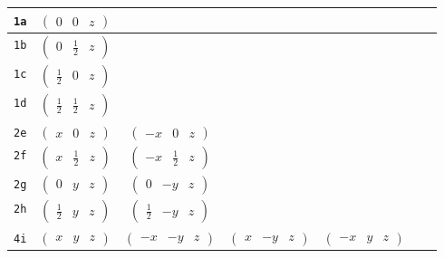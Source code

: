 \documentclass[fleqn,9pt,landscape]{jsarticle}
\begin{document}
\begin{center}
\begin{longtable}{ccccccc}
{\tt 1a} & $ \begin{pmatrix} 0 & 0 & z \end{pmatrix} $ & $  $ & $  $ & $  $ \\ \hline
{\tt 1b} & $ \begin{pmatrix} 0 & \frac{1}{2} & z \end{pmatrix} $ & $  $ & $  $ & $  $ \\ \hline
{\tt 1c} & $ \begin{pmatrix} \frac{1}{2} & 0 & z \end{pmatrix} $ & $  $ & $  $ & $  $ \\ \hline
{\tt 1d} & $ \begin{pmatrix} \frac{1}{2} & \frac{1}{2} & z \end{pmatrix} $ & $  $ & $  $ & $  $ \\ \hline
{\tt 2e} & $ \begin{pmatrix} x & 0 & z \end{pmatrix} $ & $ \begin{pmatrix} - x & 0 & z \end{pmatrix} $ & $  $ & $  $ \\ \hline
{\tt 2f} & $ \begin{pmatrix} x & \frac{1}{2} & z \end{pmatrix} $ & $ \begin{pmatrix} - x & \frac{1}{2} & z \end{pmatrix} $ & $  $ & $  $ \\ \hline
{\tt 2g} & $ \begin{pmatrix} 0 & y & z \end{pmatrix} $ & $ \begin{pmatrix} 0 & - y & z \end{pmatrix} $ & $  $ & $  $ \\ \hline
{\tt 2h} & $ \begin{pmatrix} \frac{1}{2} & y & z \end{pmatrix} $ & $ \begin{pmatrix} \frac{1}{2} & - y & z \end{pmatrix} $ & $  $ & $  $ \\ \hline
{\tt 4i} & $ \begin{pmatrix} x & y & z \end{pmatrix} $ & $ \begin{pmatrix} - x & - y & z \end{pmatrix} $ & $ \begin{pmatrix} x & - y & z \end{pmatrix} $ & $ \begin{pmatrix} - x & y & z \end{pmatrix} $ \\
\end{longtable}
\end{center}
\end{document}
